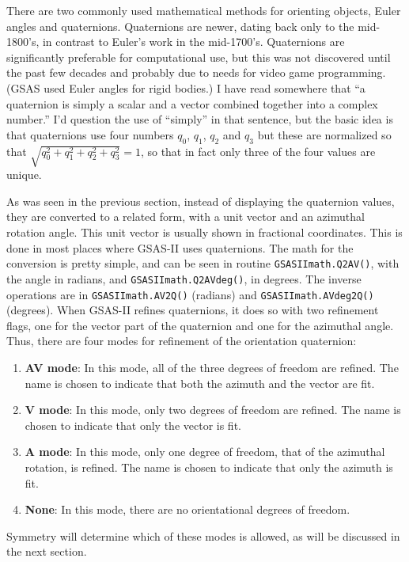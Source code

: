 There are two commonly used mathematical methods for orienting objects, Euler angles and quaternions. Quaternions are newer, dating back only to the mid-1800's, in contrast to Euler's work in the mid-1700's. Quaternions are significantly preferable for computational use, but this was not discovered until the past few decades and probably due to needs for video game programming. (GSAS used Euler angles for rigid bodies.) I have read somewhere that ``a quaternion is simply a scalar and a vector combined together into a complex number.'' I'd question the use of ``simply'' in that sentence, but the basic idea is that quaternions use four numbers $q_0$, $q_1$, $q_2$ and $q_3$ but these are normalized so that  $\sqrt{q_0^2 + q_1^2 + q_2^2 + q_3^2} = 1$, so that in fact only three of the four values are unique. 

As was seen in the previous section, instead of displaying the quaternion values, they are converted to a related form, with a unit vector and an azimuthal rotation angle. This unit vector is usually shown in fractional coordinates. This is done in most places where GSAS-II uses quaternions. The math for the conversion is pretty simple, and can be seen in routine \texttt{GSASIImath.Q2AV()}, with the angle in radians, and \texttt{GSASIImath.Q2AVdeg()}, in degrees. The inverse operations are in \texttt{GSASIImath.AV2Q()} (radians) and \texttt{GSASIImath.AVdeg2Q()} (degrees). When GSAS-II refines quaternions, it does so with two refinement flags, one for the vector part of the quaternion and one for the azimuthal angle. Thus, there are four modes for refinement of the orientation quaternion:
\begin{enumerate}
    \item \textbf{AV mode}: In this mode, all of the three degrees of freedom are refined. The name is chosen to indicate that both the azimuth and the vector are fit. 
    \item \textbf{V mode}: In this mode, only two degrees of freedom are refined. The name is chosen to indicate that only the vector is fit. 
    \item \textbf{A mode}: In this mode, only one degree of freedom, that of the azimuthal rotation,  is refined. The name is chosen to indicate that only the azimuth is fit. 
    \item \textbf{None}: In this mode, there are no orientational degrees of freedom.
\end{enumerate}
Symmetry will determine which of these modes is allowed, as will be discussed in the next section. 

